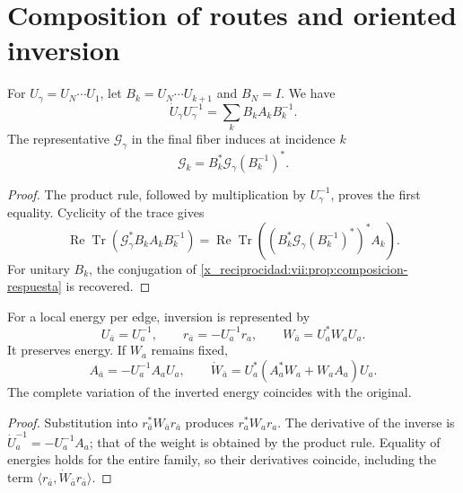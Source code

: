 \section{Composition of routes and oriented inversion}

\begin{proposition}
\label{x_reciprocidad:vii:prop:pullback-invertible}
For \(U_\gamma=U_N\cdots U_1\), let
\(B_k=U_N\cdots U_{k+1}\) and \(B_N=I\). We have
\[
 \dot U_\gamma U_\gamma^{-1}
   =\sum_kB_kA_kB_k^{-1}.
\]
The representative \(\mathcal G_\gamma\) in the final fiber induces
at incidence \(k\)
\begin{equation}
 \mathcal G_k=B_k^*\mathcal G_\gamma(B_k^{-1})^*.
 \label{x_reciprocidad:vii:eq:transporte-contragrediente}
\end{equation}
\end{proposition}

\begin{proof}
The product rule, followed by multiplication by
\(U_\gamma^{-1}\), proves the first equality. Cyclicity of the
trace gives
\[
 \operatorname{Re}\operatorname{Tr}
  (\mathcal G_\gamma^*B_kA_kB_k^{-1})
 =\operatorname{Re}\operatorname{Tr}
  ((B_k^*\mathcal G_\gamma(B_k^{-1})^*)^*A_k).
\]
For unitary \(B_k\), the conjugation of
\ref{x_reciprocidad:vii:prop:composicion-respuesta} is recovered.
\end{proof}

\begin{proposition}
\label{x_reciprocidad:vii:prop:inversion-congruencia}
For a local energy per edge, inversion is represented by
\begin{equation}
 U_{\bar a}=U_a^{-1},\qquad
 r_{\bar a}=-U_a^{-1}r_a,\qquad
 W_{\bar a}=U_a^*W_aU_a.
 \label{x_reciprocidad:vii:eq:inversion-peso-general}
\end{equation}
It preserves energy. If \(W_a\) remains fixed,
\[
 A_{\bar a}=-U_a^{-1}A_aU_a,\qquad
 \dot W_{\bar a}=U_a^*(A_a^*W_a+W_aA_a)U_a.
\]
The complete variation of the inverted energy coincides with the original.
\end{proposition}

\begin{proof}
Substitution into \(r_{\bar a}^*W_{\bar a}r_{\bar a}\)
produces \(r_a^*W_ar_a\). The derivative of the inverse is
\(\dot U_a^{-1}=-U_a^{-1}A_a\); that of the weight is obtained by
the product rule. Equality of energies holds for the entire
family, so their derivatives coincide, including the term
\(\langle r_{\bar a},\dot W_{\bar a}r_{\bar a}\rangle\).
\end{proof}

